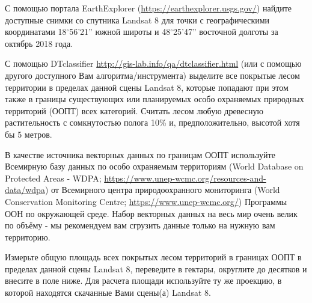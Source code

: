 
С помощью портала EarthExplorer (\url{https://earthexplorer.usgs.gov/}) найдите доступные снимки со спутника 
Landsat 8 для точки с географическими координатами 18$^{\circ}$56'21'' южной широты и 48$^{\circ}$25'47'' восточной долготы за октябрь 2018 года.

С помощью DTclassifier \url{http://gis-lab.info/qa/dtclassifier.html} (или с помощью другого доступного Вам алгоритма/инструмента) выделите все покрытые лесом территории в пределах данной сцены Landsat 8, которые попадают при этом также в границы существующих или планируемых особо охраняемых природных территорий (ООПТ) всех категорий. Считать лесом любую древесную растительность с сомкнутостью полога 10\% и, предположительно, высотой хотя бы 5 метров.

В качестве источника векторных данных по границам ООПТ используйте Всемирную базу 
данных по особо охраняемым территориям (World Database on Protected Areas - WDPA; \url{https://www.unep-wcmc.org/resources-and-data/wdpa}) от 
Всемирного центра природоохранного мониторинга (World Conservation Monitoring Centre; \url{https://www.unep-wcmc.org/}) Программы ООН по окружающей среде. Набор векторных данных на весь мир очень велик по объёму - мы рекомендуем вам сгрузить данные только на нужную вам территорию. 

Измерьте общую площадь всех покрытых лесом территорий в границах ООПТ в пределах данной сцены Landsat 8, переведите в гектары, округлите до десятков и внесите в поле ниже. Для расчета площади используйте ту же проекцию, в которой находятся скачанные Вами сцены(а) Landsat 8.